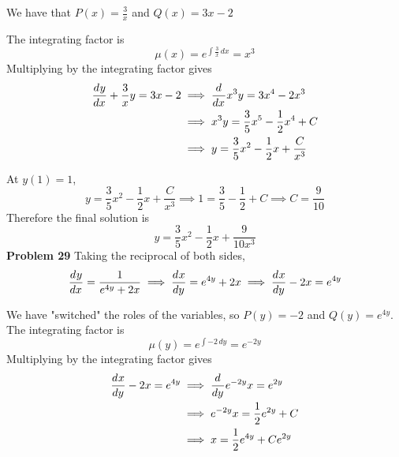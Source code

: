 We have that 
$P(x) = \frac{3}{x}$ and 
$Q(x) = 3x-2$

The integrating factor is 
\[
    \mu(x)
    = e^{\int \frac{3}{x} \,dx}
    = x^3
\]
Multiplying by the integrating factor gives 
\begin{align*}
    \frac{d^{} y}{d x^{}} + \frac{3}{x}y = 3x-2
    &\implies \frac{d^{} }{d x^{}} x^3y = 3x^4-2x^3 \\
    &\implies x^3y = \frac{3}{5}x^5 - \frac{1}{2} x^4 + C \\
    &\implies y = \frac{3}{5}x^2 - \frac{1}{2} x + \frac{C}{x^3}
\end{align*}

At $y(1) = 1$,
\[
    y = \frac{3}{5}x^2 - \frac{1}{2} x + \frac{C}{x^3}
    \implies 1 = \frac{3}{5} - \frac{1}{2} + C
    \implies C = \frac{9}{10}
\]
Therefore the final solution is 
\[
    y = \frac{3}{5}x^2 - \frac{1}{2} x + \frac{9}{10x^3}
\]
\textbf{Problem 29}
Taking the reciprocal of both sides,
\[
    \frac{d^{} y}{d x^{}} = \frac{1}{e^{4y}+2x}
    \implies \frac{d^{} x}{d y^{}} = e^{4y}+2x
    \implies \frac{d^{} x}{d y^{}} -2x = e^{4y}
\]

We have "switched" the roles of the variables, so 
$P(y) = -2$ and $Q(y) = e^{4y}$.
The integrating factor is 
\[
    \mu(y)
    = e^{\int -2 \,dy}
    = e^{-2y}
\]
Multiplying by the integrating factor gives 
\begin{align*}
    \frac{d^{} x}{d y^{}} -2x = e^{4y}
    &\implies \frac{d^{} }{d y^{}} e^{-2y}x = e^{2y} \\
    &\implies e^{-2y}x = \frac{1}{2}e^{2y} + C \\ 
    &\implies x = \frac{1}{2}e^{4y} + Ce^{2y}
\end{align*}


